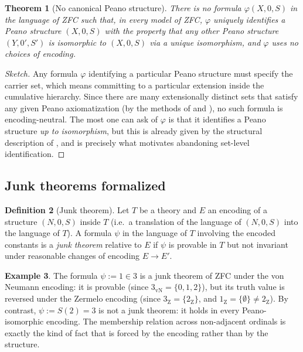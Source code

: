 \documentclass[12pt]{article}
\newtheorem{theorem}{Theorem}[section]
\theoremstyle{definition}
\newtheorem{definition}[theorem]{Definition}
\newtheorem{example}[theorem]{Example}
\theoremstyle{remark}
\begin{document}
\begin{theorem}[No canonical Peano structure]\label{thm:no-canonical}
There is no formula $\varphi(X, 0, S)$ in the language of ZFC such that, in
every model of ZFC, $\varphi$ uniquely identifies a Peano structure
$(X, 0, S)$ with the property that any other Peano structure $(Y, 0', S')$
is isomorphic to $(X, 0, S)$ via a unique isomorphism, \emph{and}
$\varphi$ uses no choices of encoding.
\end{theorem}

\begin{proof}[Sketch]
Any formula $\varphi$ identifying a particular Peano structure must
specify the carrier set, which means committing to a particular extension
inside the cumulative hierarchy. Since there are many extensionally distinct
sets that satisfy any given Peano axiomatization (by the methods of
 and ), no such formula is encoding-neutral.
The most one can ask of $\varphi$ is that it identifies a Peano structure
\emph{up to isomorphism}, but this is already given by the structural
description of , and is precisely what motivates
abandoning set-level identification.
\end{proof}

\subsection{Junk theorems formalized}

\begin{definition}[Junk theorem]
Let $T$ be a theory and $E$ an encoding of a structure $(N, 0, S)$ inside
$T$ (i.e.\ a translation of the language of $(N, 0, S)$ into the language of
$T$). A formula $\psi$ in the language of $T$ involving the encoded
constants is a \emph{junk theorem} relative to $E$ if $\psi$ is provable in
$T$ but not invariant under reasonable changes of encoding $E \to E'$.
\end{definition}

\begin{example}
The formula $\psi := 1 \in 3$ is a junk theorem of ZFC under the von Neumann
encoding: it is provable (since $3_{\mathrm{vN}} = \{0,1,2\}$), but its truth
value is reversed under the Zermelo encoding (since
$3_{\mathrm{Z}} = \{2_{\mathrm{Z}}\}$, and $1_{\mathrm{Z}} = \{\emptyset\}
\neq 2_{\mathrm{Z}}$). By contrast, $\psi := S(2) = 3$ is not a junk theorem:
it holds in every Peano-isomorphic encoding. The membership relation across
non-adjacent ordinals is exactly the kind of fact that is forced by the
encoding rather than by the structure.
\end{example}
\end{document}
